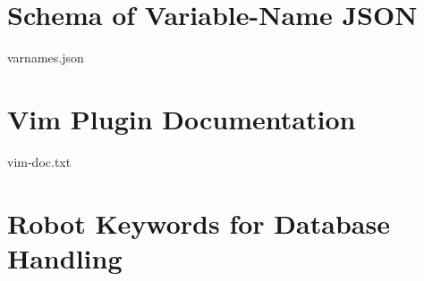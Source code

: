 \begin{appendices}
	\chapter{Schema of Variable-Name JSON}
	\label{appendix:schema}
	
		{varnames.json}
	\chapter{Vim Plugin Documentation}
	\label{appendix:vimplugindoc}
	
		{vim-doc.txt}
	\chapter{Robot Keywords for Database Handling}
	\label{appendix:databasekeywords}
	

\end{appendices}
